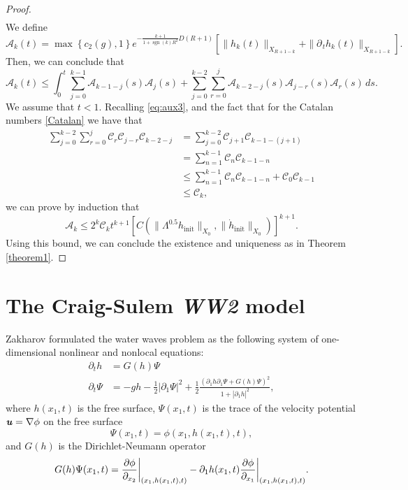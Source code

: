 \documentclass[11pt]{article}
\theoremstyle{plain}
\theoremstyle{definition}
\theoremstyle{definition}
\def\p{\text{\bf\emph{p}}}
\def\u{\text{\bf\emph{u}}}
\DeclareMathOperator{\sgn}{sgn}
\def\bp{{\partial_1}}
\def\p{{\partial\hspace{1pt}}}
\def\hinit{h_{\operatorname{init}}}
\def\htinit{{\dot h}_{\operatorname{init}}}
\begin{document}
\begin{proof}
\begin{align*}
\end{align*}
We define
$$
\mathscr{A}_k(t)=\max\left\{c_2(g),1\right\}e^{-\frac{k+1}{1+\sgn(k)R^2}D(R+1)}\left[\|h_k(t)\|_{X_{R+1-k}}+\|\p_{\!t} h_k(t)\|_{X_{R+1-k}}\right].
$$
Then, we can conclude that
$$
\mathscr{A}_k(t)\leq \int_0^t \sum_{j=0}^{k-1} \mathscr{A}_{k-1-j}(s)\mathscr{A}_{j}(s)+\sum_{j=0}^{k-2}\sum_{r=0}^{j} \mathscr{A}_{k-2-j}(s)\mathscr{A}_{j-r}(s)\mathscr{A}_{r}(s) \,ds.
$$
We assume that $t<1$. Recalling \eqref{eq:aux3}, and the fact that for the Catalan numbers \eqref{Catalan} we have that
\begin{align*}
\sum_{j=0}^{k-2}\sum_{r=0}^{j}\mathcal{C}_r\mathcal{C}_{j-r}\mathcal{C}_{k-2-j}&=\sum_{j=0}^{k-2}\mathcal{C}_{j+1}\mathcal{C}_{k-1-(j+1)}\\
&=\sum_{n=1}^{k-1}\mathcal{C}_{n}\mathcal{C}_{k-1-n}\\
&\leq\sum_{n=1}^{k-1}\mathcal{C}_{n}\mathcal{C}_{k-1-n}+\mathcal{C}_{0}\mathcal{C}_{k-1}\\
&\leq \mathcal{C}_{k},
\end{align*}
we can prove by induction that
$$
\mathscr{A}_k\leq  2^k\mathcal{C}_kt^{k+1}\left[C(\|\Lambda^{0.5}\hinit\|_{X_0},\|\htinit\|_{X_0})\right]^{k+1}.
$$
Using this bound, we can conclude the existence and uniqueness as in Theorem \ref{theorem1}.
\end{proof}

\section{The Craig-Sulem \emph{WW2} model}\label{sec:CSWW2}
Zakharov  \cite{zakharov1968stability} formulated the water waves problem as the following system of one-dimensional nonlinear and nonlocal equations:
\begin{subequations}\label{Zak1phase}
\begin{alignat}{2}
\partial_t h&=G(h)\Psi\\
\partial_t \Psi&= -g h-\frac{1}{2}|\bp \Psi|^2+\frac{1}{2}\frac{(\bp  h\bp\Psi+G(h)\Psi)^2}{1+|\bp h|^2},
\end{alignat}
\end{subequations}
where $h(x_1,t)$ is the free surface, $\Psi(x_1,t)$ is the trace of the velocity potential $\u=\nabla\phi$ on the free surface
$$
\Psi(x_1,t)=\phi(x_1,h(x_1,t),t),
$$
and $G(h)$ is the Dirichlet-Neumann operator
\begin{equation}\label{D2N}
G(h)\Psi(x_1,t)=\frac{\partial\phi}{\partial_{x_2}}\bigg{|}_{(x_1,h(x_1,t),t)}-\bp h(x_1,t)\frac{\partial\phi}{\partial_{x_1}}\bigg{|}_{(x_1,h(x_1,t),t)}.
\end{equation}
\end{document}
